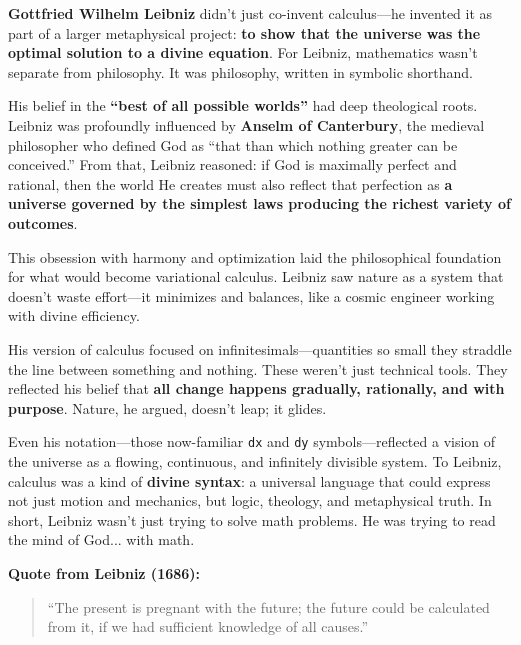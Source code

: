\begin{tcolorbox}[colback=blue!5!white, colframe=blue!50!black, 
  title={Historical Sidebar: Leibniz—Calculus, Harmony, and the Divine Algorithm}]
  
      \textbf{Gottfried Wilhelm Leibniz} didn’t just co-invent calculus—he invented it as part of a larger metaphysical project: \textbf{to show that the universe was the optimal solution to a divine equation}. For Leibniz, mathematics wasn’t separate from philosophy. It was philosophy, written in symbolic shorthand.
  
      \medskip
  
      His belief in the \textbf{“best of all possible worlds”} had deep theological roots. Leibniz was profoundly influenced by \textbf{Anselm of Canterbury}, the medieval philosopher who defined God as “that than which nothing greater can be conceived.” From that, Leibniz reasoned: if God is maximally perfect and rational, then the world He creates must also reflect that perfection as \textbf{a universe governed by the simplest laws producing the richest variety of outcomes}.
  
      \medskip
  
      This obsession with harmony and optimization laid the philosophical foundation for what would become variational calculus. Leibniz saw nature as a system that doesn’t waste effort—it minimizes and balances, like a cosmic engineer working with divine efficiency.
  
      \medskip
  
      His version of calculus focused on infinitesimals—quantities so small they straddle the line between something and nothing. These weren’t just technical tools. They reflected his belief that \textbf{all change happens gradually, rationally, and with purpose}. Nature, he argued, doesn’t leap; it glides.
  
      \medskip
  
      Even his notation—those now-familiar \texttt{dx} and \texttt{dy} symbols—reflected a vision of the universe as a flowing, continuous, and infinitely divisible system. To Leibniz, calculus was a kind of \textbf{divine syntax}: a universal language that could express not just motion and mechanics, but logic, theology, and metaphysical truth. In short, Leibniz wasn’t just trying to solve math problems. He was trying to read the mind of God... with math.
  
      \medskip
  
      \textbf{Quote from Leibniz (1686):}
      \begin{quote}
      “The present is pregnant with the future; the future could be calculated from it, if we had sufficient knowledge of all causes.”
      \end{quote}
  
  
  \end{tcolorbox}
  





